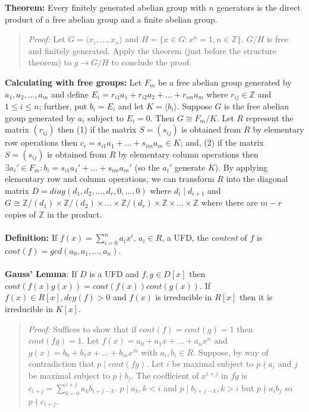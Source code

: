 {\bf Theorem:}
Every finitely generated abelian group with $n$ generators is the direct product of a
free abelian group and a finite abelian group.
\begin{quote}
\emph{Proof:}  
Let $G= \langle x_i , \ldots ,x_n \rangle$ and $H= \{ x \in G: x^n=1, n \in {\mathbb Z} \}$.
$G/H$ is free and finitely generated.  Apply the theorem (just before the structure theorem)
to $g \rightarrow G/H$ to conclude the proof.
\end{quote}
{\bf Calculating with free groups:}
Let $F_m$ be a free abelian group generated by $a_1 , a_2 , \ldots , a_m$ and
define $E_i= r_{i1} a_1 + r_{i2} a_2 + \ldots + r_{im} a_m$ where
$r_{ij} \in {\mathbb Z}$ and $1 \le i \le n$; further, put
$b_i= E_i$ and let $K= \langle b_i \rangle$.  
Suppose $G$ is the free abelian group generated
by $a_i$ subject to $E_i = 0$.  Then $G \cong F_m / K$.  Let $R$ represent the matrix
$(r_{ij})$ then 
(1) if the matrix $S=(s_{ij})$ is obtained from $R$ by elementary row operations then
$c_i= s_{i1} a_1 + \ldots + s_{im} a_m \in K$; and,
(2) if the matrix $S=(s_{ij})$ is obtained from $R$ by elementary column operations then
$\exists a_i' \in F_m: b_i= s_{i1} a_1' + \ldots + s_{im} a_m'$ (so the $a_i'$ generate
$K$).  By applying elementary row and column operations, we can transform $R$ into
the diagonal matrix $D= diag(d_1 , d_2 , \ldots , d_r , 0, \ldots , 0)$ where
$d_i \mid d_{i+1}$
and $G \cong {\mathbb Z}/(d_1) \times {\mathbb Z}/(d_2) \times \ldots 
\times {\mathbb Z}/(d_r) \times {\mathbb Z} \times \ldots \times {\mathbb Z}$ where there
are $m-r$ copies of ${\mathbb Z}$ in the product.
\\
\\
{\bf Definition:} If $f(x)= \sum_{i=0}^n a_i x^i$, $a_i \in R$, a UFD, the \emph{content} of
$f$ is $cont(f)= gcd(a_0, a_1, \ldots, a_n)$.  
\\
\\
{\bf Gauss' Lemma}: 
If $D$ is a UFD and $f, g \in D[x]$ then
$cont(f(x)g(x))= cont(f(x)) cont(g(x))$.  If $f(x) \in R[x], deg(f)>0$ and $f(x)$
is irreducible in $R[x]$ then it is irreducible in $K[x]$.
\begin{quote}
\emph{Proof:}
Suffices to show that if $cont(f)=cont(g)=1$ then $cont(fg)=1$.  Let
$f(x)= a_0 + a_1 x + \ldots +a_n x^n$ and
$g(x)= b_0 + b_1 x + \ldots +b_m x^m$ with $a_i, b_i \in R$.  Suppose, by way of
contradiction that $p \mid cont(fg)$.  Let 
$i$ be maximal subject to $p \nmid a_i$ and
$j$ be maximal subject to $p \nmid b_j$.  The coefficient of $x^{i+j}$ in $fg$ is
$c_{i+j}= \sum_{k=0}^{i+j} a_k b_{i+j-k}$.  
$p \mid a_k, k<i$ and
$p \mid b_{i+j-k}, k>i$ but $p \nmid a_i b_j$ so $p \nmid c_{i+j}$.
\end{quote}
